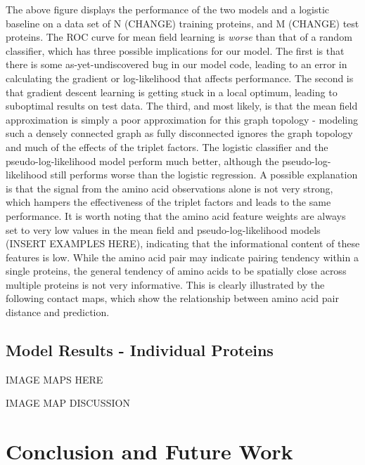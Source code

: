 \documentclass{article}
\begin{document}
The above figure displays the performance of the two models and a logistic baseline on a data set of N (CHANGE) training proteins, and M (CHANGE) test proteins. The ROC curve for  mean field learning is \textit{worse} than that of a random classifier, which has three possible implications for our model. The first is that there is some as-yet-undiscovered bug in our model code, leading to an error in calculating the gradient or log-likelihood that affects performance. The second is that gradient descent learning is getting stuck in a local optimum, leading to suboptimal results on test data. The third, and most likely, is that the mean field approximation is simply a poor approximation for this graph topology - modeling such a densely connected graph as fully disconnected ignores the graph topology and much of the effects of the triplet factors. The logistic classifier and the pseudo-log-likelihood model perform much better, although the pseudo-log-likelihood still performs worse than the logistic regression. A possible explanation is that the signal from the amino acid observations alone is not very strong, which hampers the effectiveness of the triplet factors and leads to the same performance. It is worth noting that the amino acid feature weights are always set to very low values in the mean field and pseudo-log-likelihood models (INSERT EXAMPLES HERE), indicating that the informational content of these features is low. While the amino acid pair may indicate pairing tendency within a single proteins, the general tendency of amino acids to be spatially close across multiple proteins is not very informative. This is clearly illustrated by the following contact maps, which show the relationship between amino acid pair distance and prediction. 

\subsection{Model Results - Individual Proteins}


IMAGE MAPS HERE

IMAGE MAP DISCUSSION


\section{Conclusion and Future Work}
\end{document}
